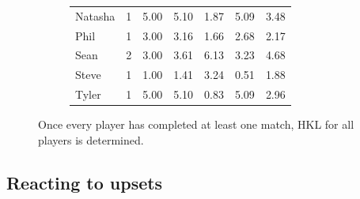 \documentclass[letterpaper, 10 pt, conference]{ieeeconf}  %
\begin{document}
\begin{figure}[h!b]
\begin{subfigure}[hb]{0.4\textwidth}
\begin{tabular}{lccc|ccc}
                        Natasha	& 1	& 5.00  & 5.10 & 1.87 & 5.09 & 3.48 \\
                        Phil	& 1	& 3.00	& 3.16 & 1.66 & 2.68 & 2.17 \\
                        Sean	& 2	& 3.00	& 3.61 & 6.13 & 3.23 & 4.68 \\
                        Steve	& 1	& 1.00 	& 1.41 & 3.24 & 0.51 & 1.88 \\
                        Tyler	& 1	& 5.00  & 5.10 & 0.83 & 5.09 & 2.96 \\
                        \bottomrule
                \end{tabular}
        \end{subfigure}
        \caption{Once every player has completed at least one match, HKL for all 
                 players is determined.}
\end{figure}
\clearpage

\subsection{Reacting to upsets}
\end{document}

